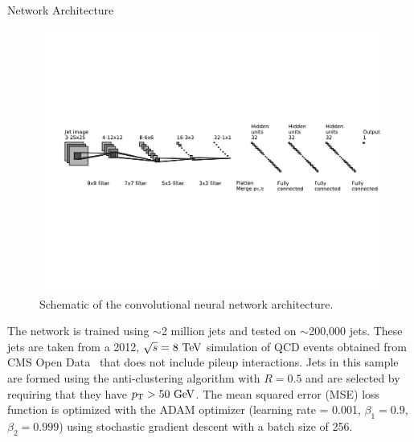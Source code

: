 \begin{section}{Network Architecture}
\begin{figure}[tbp!]
\begin{center}
\includegraphics[angle=0,width=0.95\columnwidth]{fig/cnn_arch.pdf}
\end{center}
\caption{Schematic of the convolutional neural network architecture.}
\label{fig:cnn_arch}
\end{figure}

The network is trained using $\sim$2 million jets and tested on $\sim$200,000 jets. 
These jets are taken from a 2012, $\sqrt{s} = 8~\mathrm{Te\kern -0.1em V}$ simulation of QCD events obtained from CMS Open Data~\cite{cms_opendata} that does not include pileup interactions.
Jets in this sample are formed using the anti-\kT clustering algorithm with $R = 0.5$ and are selected by requiring that they have $p_{\mathrm{T}} > 50~\mathrm{Ge\kern -0.1em V}$.
The mean squared error (MSE) loss function is optimized with the ADAM optimizer (learning rate = 0.001, $\beta_1 = 0.9$, $\beta_2 = 0.999$) using stochastic gradient descent with a batch size of 256.

\end{section}

